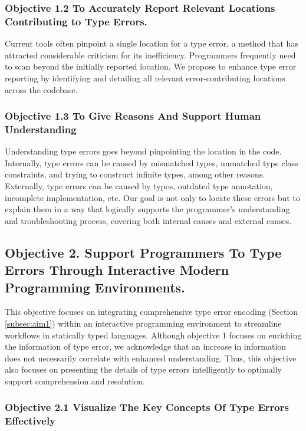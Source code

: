 \subsubsection{Objective 1.2 To Accurately Report Relevant Locations Contributing to Type Errors.}
Current tools often pinpoint a single location for a type error, a method that has attracted considerable criticism for its inefficiency. Programmers frequently need to scan beyond the initially reported location. We propose to enhance type error reporting by identifying and detailing all relevant error-contributing locations across the codebase.

\subsubsection{Objective 1.3 To Give Reasons And Support Human Understanding}
Understanding type errors goes beyond pinpointing the location in the code. Internally, type errors can be caused by mismatched types, unmatched type class constraints, and trying to construct infinite types, among other reasons. Externally, type errors can be caused by typos, outdated type annotation, incomplete implementation, etc. Our goal is not only to locate these errors but to explain them in a way that logically supports the programmer's understanding and troubleshooting process, covering both internal causes and external causes.



\subsection{Objective 2. Support Programmers To Type Errors Through Interactive Modern Programming Environments.}

This objective focuses on integrating comprehensive type error encoding (Section \ref{subsec:aim1}) within an interactive programming environment to streamline workflows in statically typed languages. Although objective 1 focuses on enriching the information of type error,  we acknowledge that an increase in information does not necessarily correlate with enhanced understanding. Thus, this objective also focuses on presenting the details of type errors intelligently to optimally support comprehension and resolution.

\subsubsection{Objective 2.1 Visualize The Key Concepts Of Type Errors Effectively}

